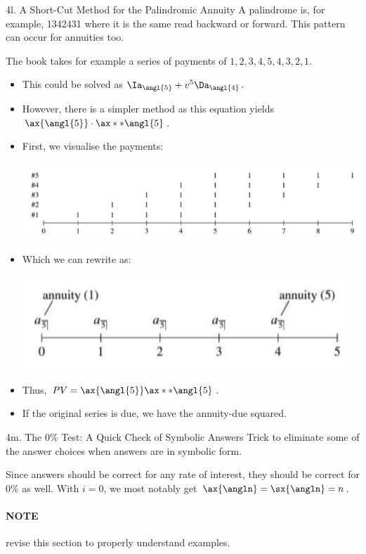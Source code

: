 \begin{CHPT_SUMM_AUTO}[label = {L.-4l}]{4l. A Short-Cut Method for the Palindromic Annuity}
A palindrome is, for example, 1342431 where it is the same read backward or forward. This pattern can occur for annuities too.

The book takes for example a series of payments of $1, 2, 3, 4, 5, 4, 3, 2, 1$. 
	\begin{itemize}[leftmargin = *]
		\item	This could be solved as $\Ia_{\angl{5}} + v^{5} \Da_{\angl{4}}$.
		\item	However, there is a simpler method as this equation yields $\ax{\angl{5}} \cdot \ax**{\angl{5}}$.
		\item	First, we visualise the payments:
			\begin{center}
			\includegraphics[scale=.4]{img/palyndrome-graph.png}
			\end{center}
		\item	Which we can rewrite as:
			\begin{center}
			\includegraphics[scale=.4]{img/palyndrome-pmt.png}
			\end{center}
		\item	Thus, $PV = \ax{\angl{5}}\ax**{\angl{5}}$.
		\item	If the original series is due, we have the annuity-due squared.
	\end{itemize}
\end{CHPT_SUMM_AUTO}

\begin{CHPT_SUMM_AUTO}[label = {L.-4m}]{4m. The 0\% Test: A Quick Check of Symbolic Answers}
Trick to eliminate some of the answer choices when answers are in symbolic form.

Since answers should be correct for any rate of interest, they should be correct for $0\%$ as well. With $i = 0$, we most notably get $\ax{\angln} = \sx{\angln} = n$.
\paragraph*{NOTE}	revise this section to properly understand examples.
\end{CHPT_SUMM_AUTO}
